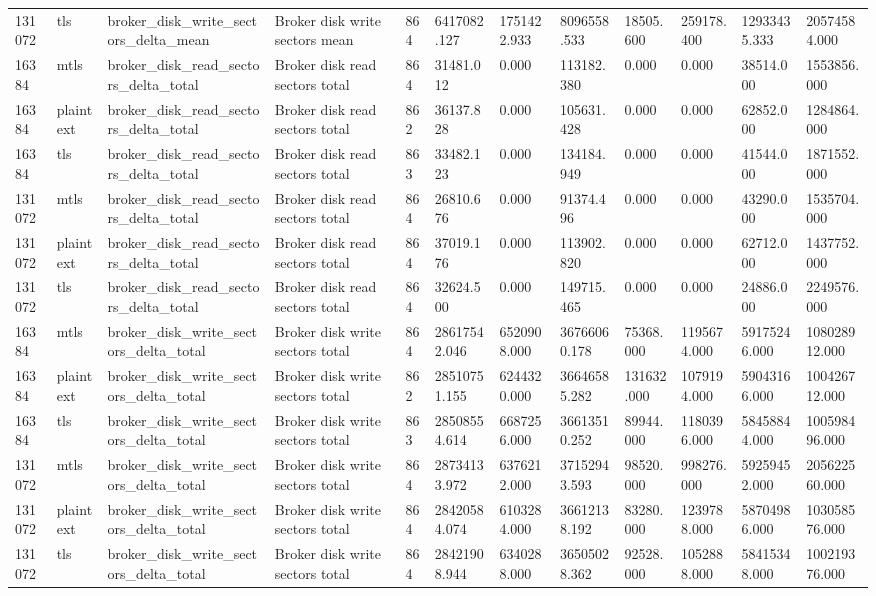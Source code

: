 \begin{longtable}{llllllllllll}
131072 & tls & broker\_disk\_write\_sectors\_delta\_mean & Broker disk write sectors mean & 864 & 6417082.127 & 1751422.933 & 8096558.533 & 18505.600 & 259178.400 & 12933435.333 & 20574584.000 \\
16384 & mtls & broker\_disk\_read\_sectors\_delta\_total & Broker disk read sectors total & 864 & 31481.012 & 0.000 & 113182.380 & 0.000 & 0.000 & 38514.000 & 1553856.000 \\
16384 & plaintext & broker\_disk\_read\_sectors\_delta\_total & Broker disk read sectors total & 862 & 36137.828 & 0.000 & 105631.428 & 0.000 & 0.000 & 62852.000 & 1284864.000 \\
16384 & tls & broker\_disk\_read\_sectors\_delta\_total & Broker disk read sectors total & 863 & 33482.123 & 0.000 & 134184.949 & 0.000 & 0.000 & 41544.000 & 1871552.000 \\
131072 & mtls & broker\_disk\_read\_sectors\_delta\_total & Broker disk read sectors total & 864 & 26810.676 & 0.000 & 91374.496 & 0.000 & 0.000 & 43290.000 & 1535704.000 \\
131072 & plaintext & broker\_disk\_read\_sectors\_delta\_total & Broker disk read sectors total & 864 & 37019.176 & 0.000 & 113902.820 & 0.000 & 0.000 & 62712.000 & 1437752.000 \\
131072 & tls & broker\_disk\_read\_sectors\_delta\_total & Broker disk read sectors total & 864 & 32624.500 & 0.000 & 149715.465 & 0.000 & 0.000 & 24886.000 & 2249576.000 \\
16384 & mtls & broker\_disk\_write\_sectors\_delta\_total & Broker disk write sectors total & 864 & 28617542.046 & 6520908.000 & 36766060.178 & 75368.000 & 1195674.000 & 59175246.000 & 108028912.000 \\
16384 & plaintext & broker\_disk\_write\_sectors\_delta\_total & Broker disk write sectors total & 862 & 28510751.155 & 6244320.000 & 36646585.282 & 131632.000 & 1079194.000 & 59043166.000 & 100426712.000 \\
16384 & tls & broker\_disk\_write\_sectors\_delta\_total & Broker disk write sectors total & 863 & 28508554.614 & 6687256.000 & 36613510.252 & 89944.000 & 1180396.000 & 58458844.000 & 100598496.000 \\
131072 & mtls & broker\_disk\_write\_sectors\_delta\_total & Broker disk write sectors total & 864 & 28734133.972 & 6376212.000 & 37152943.593 & 98520.000 & 998276.000 & 59259452.000 & 205622560.000 \\
131072 & plaintext & broker\_disk\_write\_sectors\_delta\_total & Broker disk write sectors total & 864 & 28420584.074 & 6103284.000 & 36612138.192 & 83280.000 & 1239788.000 & 58704986.000 & 103058576.000 \\
131072 & tls & broker\_disk\_write\_sectors\_delta\_total & Broker disk write sectors total & 864 & 28421908.944 & 6340288.000 & 36505028.362 & 92528.000 & 1052888.000 & 58415348.000 & 100219376.000 \\
\hline
\end{longtable}
